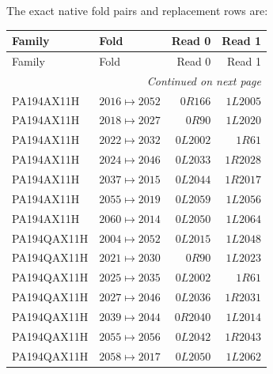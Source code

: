 The exact native fold pairs and replacement rows are:
\small
\begin{longtable}{@{}llrr@{}}
\toprule
Family & Fold & Read 0 & Read 1\\
\midrule\endfirsthead
\toprule
Family & Fold & Read 0 & Read 1\\
\midrule\endhead
\midrule\multicolumn{4}{r}{\emph{Continued on next page}}\\\endfoot
\bottomrule\endlastfoot
PA194AX11H & $2016\mapsto 2052$ & $0R166$ & $1L2005$\\
PA194AX11H & $2018\mapsto 2027$ & $0R90$ & $1L2020$\\
PA194AX11H & $2022\mapsto 2032$ & $0L2002$ & $1R61$\\
PA194AX11H & $2024\mapsto 2046$ & $0L2033$ & $1R2028$\\
PA194AX11H & $2037\mapsto 2015$ & $0L2044$ & $1R2017$\\
PA194AX11H & $2055\mapsto 2019$ & $0L2059$ & $1L2056$\\
PA194AX11H & $2060\mapsto 2014$ & $0L2050$ & $1L2064$\\
PA194QAX11H & $2004\mapsto 2052$ & $0L2015$ & $1L2048$\\
PA194QAX11H & $2021\mapsto 2030$ & $0R90$ & $1L2023$\\
PA194QAX11H & $2025\mapsto 2035$ & $0L2002$ & $1R61$\\
PA194QAX11H & $2027\mapsto 2046$ & $0L2036$ & $1R2031$\\
PA194QAX11H & $2039\mapsto 2044$ & $0R2040$ & $1L2014$\\
PA194QAX11H & $2055\mapsto 2056$ & $0L2042$ & $1R2043$\\
PA194QAX11H & $2058\mapsto 2017$ & $0L2050$ & $1L2062$\\
\end{longtable}
\normalsize
